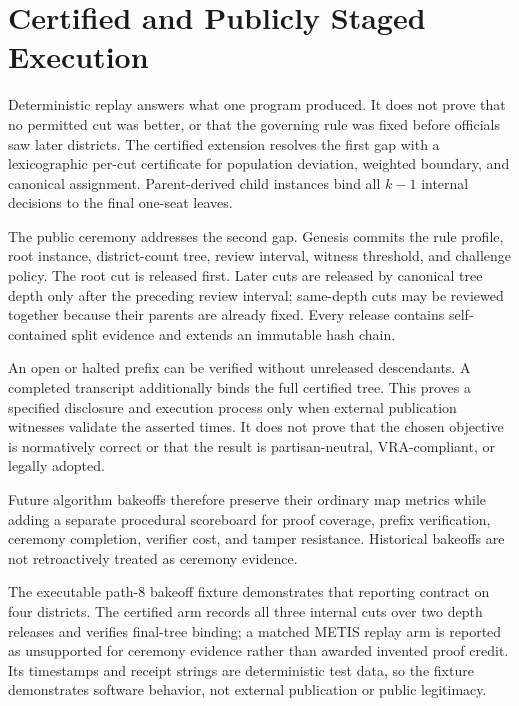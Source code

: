 \section{Certified and Publicly Staged Execution}
\label{sec:certified-ceremony}

Deterministic replay answers what one program produced. It does not prove that
no permitted cut was better, or that the governing rule was fixed before
officials saw later districts. The certified extension resolves the first gap
with a lexicographic per-cut certificate for population deviation, weighted
boundary, and canonical assignment. Parent-derived child instances bind all
$k-1$ internal decisions to the final one-seat leaves.

The public ceremony addresses the second gap. Genesis commits the rule profile,
root instance, district-count tree, review interval, witness threshold, and
challenge policy. The root cut is released first. Later cuts are released by
canonical tree depth only after the preceding review interval; same-depth cuts
may be reviewed together because their parents are already fixed. Every release
contains self-contained split evidence and extends an immutable hash chain.

An open or halted prefix can be verified without unreleased descendants. A
completed transcript additionally binds the full certified tree. This proves a
specified disclosure and execution process only when external publication
witnesses validate the asserted times. It does not prove that the chosen
objective is normatively correct or that the result is partisan-neutral,
VRA-compliant, or legally adopted.

Future algorithm bakeoffs therefore preserve their ordinary map metrics while
adding a separate procedural scoreboard for proof coverage, prefix
verification, ceremony completion, verifier cost, and tamper resistance.
Historical bakeoffs are not retroactively treated as ceremony evidence.

The executable path-8 bakeoff fixture demonstrates that reporting contract on
four districts. The certified arm records all three internal cuts over two
depth releases and verifies final-tree binding; a matched METIS replay arm is
reported as unsupported for ceremony evidence rather than awarded invented
proof credit. Its timestamps and receipt strings are deterministic test data,
so the fixture demonstrates software behavior, not external publication or
public legitimacy.
